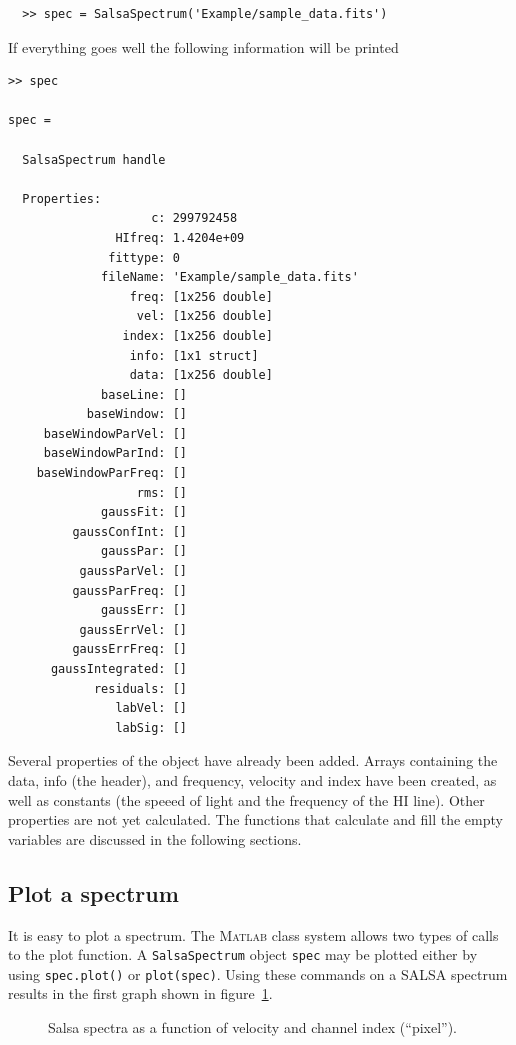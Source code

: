 \documentclass[11pt,a4paper]{article}
\begin{document}
\begin{lstlisting}
  >> spec = SalsaSpectrum('Example/sample_data.fits')
\end{lstlisting}
If everything goes well the following information will be printed 
\begin{lstlisting}
>> spec

spec = 

  SalsaSpectrum handle

  Properties:
                    c: 299792458
               HIfreq: 1.4204e+09
              fittype: 0
             fileName: 'Example/sample_data.fits'
                 freq: [1x256 double]
                  vel: [1x256 double]
                index: [1x256 double]
                 info: [1x1 struct]
                 data: [1x256 double]
             baseLine: []
           baseWindow: []
     baseWindowParVel: []
     baseWindowParInd: []
    baseWindowParFreq: []
                  rms: []
             gaussFit: []
         gaussConfInt: []
             gaussPar: []
          gaussParVel: []
         gaussParFreq: []
             gaussErr: []
          gaussErrVel: []
         gaussErrFreq: []
      gaussIntegrated: []
            residuals: []
               labVel: []
               labSig: []
\end{lstlisting}

\noindent
Several properties of the object have already been added. Arrays
containing the data, info (the header), and frequency, velocity and
index have been created, as well as constants (the speeed of light and
the frequency of the HI line). Other properties are not yet
calculated. The functions that calculate and fill the empty variables are
discussed in the following sections.

\subsection{Plot a spectrum}
\label{sec:plot-spectrum}

It is easy to plot a spectrum. The \textsc{Matlab} class system allows two
types of calls to the plot function. A \texttt{SalsaSpectrum} object
\lstinline!spec! may be plotted either by using
\lstinline!spec.plot()! or \lstinline!plot(spec)!. Using these
commands on a SALSA spectrum results in the first graph shown in figure~\ref{fig1}.

\begin{figure}[h!]
  \centering
  \caption{Salsa spectra as a function of velocity and channel index
    (``pixel'').}
  \label{fig1}
\end{figure}
\end{document}
